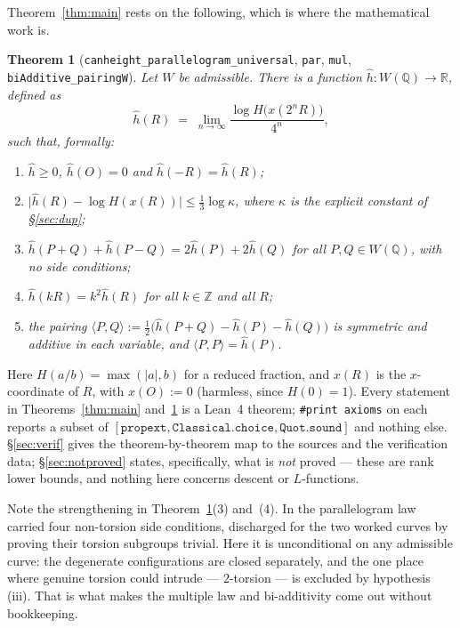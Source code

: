 \documentclass[11pt,reqno]{amsart}
\theoremstyle{plain}
\newtheorem{theorem}{Theorem}[section]
\theoremstyle{definition}
\theoremstyle{remark}
\DeclareRobustCommand{\lt}[1]{\texttt{#1}}
\newcommand{\hh}{\widehat{h}}
\newcommand{\nh}{H}
\begin{document}
Theorem~\ref{thm:main} rests on the following, which is where the
mathematical work is.

\begin{theorem}[\lt{canheight\_parallelogram\_universal}, \lt{par},
\lt{mul}, \lt{biAdditive\_pairingW}]\label{thm:height}
Let $W$ be admissible. There is a function
$\hh \colon W(\mathbb{Q}) \to \mathbb{R}$, defined as
\[
  \hh(R) \;=\; \lim_{n\to\infty}
     \frac{\log \nh\bigl(x(2^nR)\bigr)}{4^n},
\]
such that, formally:
\begin{enumerate}[label=\textup{(\arabic*)}]
  \item $\hh \ge 0$, $\hh(O) = 0$ and $\hh(-R) = \hh(R)$;
  \item $\bigl\lvert \hh(R) - \log \nh(x(R))\bigr\rvert \le
        \tfrac13 \log \kappa$, where $\kappa$ is the explicit constant
        of \S\ref{sec:dup};
  \item $\hh(P+Q) + \hh(P-Q) = 2\hh(P) + 2\hh(Q)$ for \emph{all}
        $P, Q \in W(\mathbb{Q})$, with no side conditions;
  \item $\hh(kR) = k^2\hh(R)$ for all $k \in \mathbb{Z}$ and all $R$;
  \item the pairing $\langle P,Q\rangle :=
        \tfrac12\bigl(\hh(P{+}Q) - \hh(P) - \hh(Q)\bigr)$ is symmetric
        and additive in each variable, and
        $\langle P,P\rangle = \hh(P)$.
\end{enumerate}
\end{theorem}

Here $\nh(a/b) = \max(\lvert a\rvert, b)$ for a reduced fraction, and
$x(R)$ is the $x$-coordinate of $R$, with $x(O) := 0$ (harmless, since
$\nh(0) = 1$). Every statement in Theorems~\ref{thm:main}
and~\ref{thm:height} is a Lean~4 theorem; \lt{\#print axioms} on each
reports a subset of $[\mathtt{propext}, \mathtt{Classical.choice},
\mathtt{Quot.sound}]$ and nothing else. \S\ref{sec:verif} gives the
theorem-by-theorem map to the sources and the verification data;
\S\ref{sec:notproved} states, specifically, what is \emph{not} proved
--- these are rank lower bounds, and nothing here concerns descent or
$L$-functions.

Note the strengthening in Theorem~\ref{thm:height}(3) and~(4). In
\cite{MW} the parallelogram law carried four non-torsion side
conditions, discharged for the two worked curves by proving their
torsion subgroups trivial. Here it is unconditional on any admissible
curve: the degenerate configurations are closed separately, and the one
place where genuine torsion could intrude --- $2$-torsion --- is
excluded by hypothesis (iii). That is what makes the multiple law and
bi-additivity come out without bookkeeping.
\end{document}
